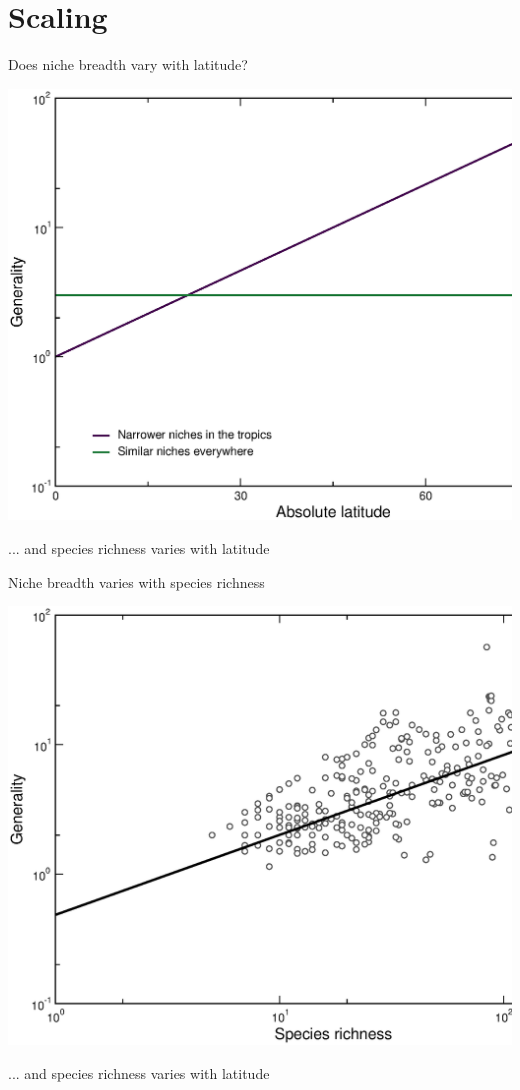 \documentclass{beamer}
\begin{document}
\section*{Scaling}
  \begin{frame}{Does niche breadth vary with latitude?}

    \begin{center}
      \includegraphics*[width=.8\textwidth]{Figures/results/Gen_vs_lat_simulated.eps}

    \vspace{.5cm}
    {\color{white}... and species richness varies with latitude}
    \end{center}

  \end{frame}


  \begin{frame}{Niche breadth varies with species richness}

    \begin{center}
      \includegraphics*[width=.8\textwidth]{Figures/results/Gen_vs_S_fitline_observed.eps}

    \vspace{.5cm}
    {\color{white}... and species richness varies with latitude}
    \end{center}

  \end{frame}
\end{document}
